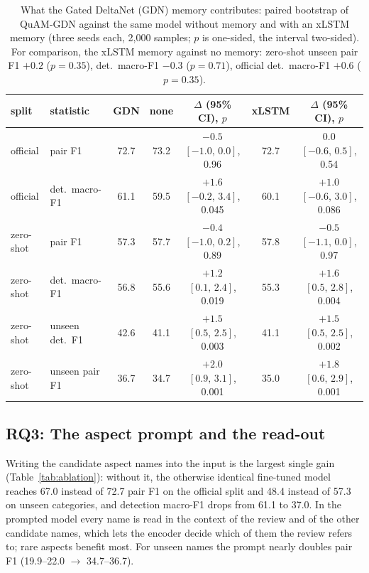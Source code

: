 \documentclass[11pt]{article}
\newcommand{\quam}{QuAM-GDN}
\begin{document}
\begin{table}[t]
\centering\small
\begin{tabular}{llccccc}
\toprule
split & statistic & GDN & none & $\Delta$ (95\% CI), $p$ & xLSTM & $\Delta$ (95\% CI), $p$ \\
\midrule
official  & pair F1          & 72.7 & 73.2 & $-0.5$ $[-1.0,\,0.0]$, 0.96 & 72.7 & $0.0$ $[-0.6,\,0.5]$, 0.54 \\
official  & det.\ macro-F1   & 61.1 & 59.5 & $+1.6$ $[-0.2,\,3.4]$, 0.045 & 60.1 & $+1.0$ $[-0.6,\,3.0]$, 0.086 \\
zero-shot & pair F1          & 57.3 & 57.7 & $-0.4$ $[-1.0,\,0.2]$, 0.89 & 57.8 & $-0.5$ $[-1.1,\,0.0]$, 0.97 \\
zero-shot & det.\ macro-F1   & 56.8 & 55.6 & $+1.2$ $[0.1,\,2.4]$, 0.019 & 55.3 & $+1.6$ $[0.5,\,2.8]$, 0.004 \\
zero-shot & unseen det.\ F1  & 42.6 & 41.1 & $+1.5$ $[0.5,\,2.5]$, 0.003 & 41.1 & $+1.5$ $[0.5,\,2.5]$, 0.002 \\
zero-shot & unseen pair F1   & 36.7 & 34.7 & $+2.0$ $[0.9,\,3.1]$, 0.001 & 35.0 & $+1.8$ $[0.6,\,2.9]$, 0.001 \\
\bottomrule
\end{tabular}
\caption{What the Gated DeltaNet (GDN) memory contributes: paired bootstrap of \quam{} against the same
model without memory and with an xLSTM memory (three seeds each, 2,000 samples; $p$ is one-sided, the
interval two-sided). For comparison, the
xLSTM memory against no memory: zero-shot unseen pair F1 $+0.2$ ($p=0.35$), det.\ macro-F1 $-0.3$
($p=0.71$), official det.\ macro-F1 $+0.6$ ($p=0.35$).}
\label{tab:memsig}
\end{table}

\subsection{RQ3: The aspect prompt and the read-out}
Writing the candidate aspect names into the input is the largest single gain (Table~\ref{tab:ablation}):
without it, the otherwise identical fine-tuned model reaches 67.0 instead of 72.7 pair F1 on the
official split and 48.4 instead of 57.3 on unseen categories, and detection macro-F1 drops from 61.1 to
37.0. In the prompted model every name is read in the context of the review and of the other candidate
names, which lets the encoder decide which of them the review refers to; rare aspects benefit most. For
unseen names the prompt nearly doubles pair F1 (19.9--22.0 $\rightarrow$ 34.7--36.7).
\end{document}
